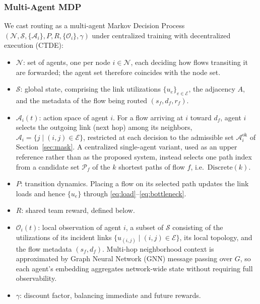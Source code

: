 \subsubsection{Multi-Agent MDP}
We cast routing as a multi-agent Markov Decision Process
$(\mathcal{N},\mathcal{S},\{\mathcal{A}_i\},\allowbreak P,R,\{\mathcal{O}_i\},\gamma)$
under centralized training with decentralized execution (CTDE):
\begin{itemize}
\item $\mathcal{N}$: set of agents, one per node $i\in\mathcal{N}$, each
deciding how flows transiting it are forwarded; the agent set therefore
coincides with the node set.
\item $\mathcal{S}$: global state, comprising the link utilizations
$\{u_e\}_{e\in\mathcal{E}}$, the adjacency $A$, and the metadata of the flow
being routed $(s_f,d_f,r_f)$.
\item $\mathcal{A}_i(t)$: action space of agent $i$. For a flow arriving at $i$
toward $d_f$, agent $i$ selects the outgoing link (next hop) among its
neighbors, $\mathcal{A}_i=\{j\mid(i,j)\in\mathcal{E}\}$, restricted at each
decision to the admissible set $\mathcal{A}^{\mathrm{ok}}_i$ of
Section~\ref{sec:mask}. A centralized single-agent variant, used as an upper
reference rather than as the proposed system, instead selects one path index
from a candidate set $\mathcal{P}_f$ of the $k$ shortest paths of flow $f$,
i.e.\ $\mathrm{Discrete}(k)$.
\item $P$: transition dynamics. Placing a flow on its selected path updates the
link loads and hence $\{u_e\}$ through \eqref{eq:load}--\eqref{eq:bottleneck}.
\item $R$: shared team reward, defined below.
\item $\mathcal{O}_i(t)$: local observation of agent $i$, a subset of
$\mathcal{S}$ consisting of the utilizations of its incident links
$\{u_{(i,j)}\mid(i,j)\in\mathcal{E}\}$, its local topology, and the flow
metadata $(s_f,d_f)$. Multi-hop neighborhood context is approximated by
Graph Neural Network (GNN) message passing over $G$, so each agent's embedding
aggregates network-wide state without requiring full observability.
\item $\gamma$: discount factor, balancing immediate and future rewards.
\end{itemize}

